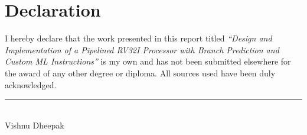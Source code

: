 \chapter*{Declaration}
\thispagestyle{empty}

\vspace*{2cm}
I hereby declare that the work presented in this report titled
\textit{``Design and Implementation of a Pipelined RV32I Processor with
Branch Prediction and Custom ML Instructions''}
is my own and has not been submitted elsewhere for the award of any other
degree or diploma. All sources used have been duly acknowledged.

\vspace{3cm}
\noindent\rule{6cm}{0.4pt}\\
Vishnu Dheepak

\clearpage
